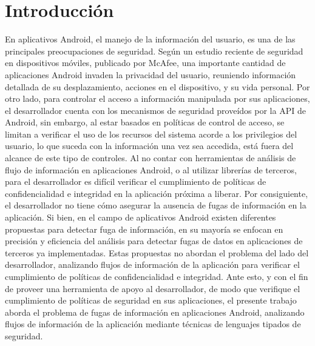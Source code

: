 \label{ch:introduccion}
\chapter{Introducción}
% 
% 

En aplicativos Android, el manejo de la información del usuario, es una de las
principales preocupaciones de seguridad. Según un estudio reciente de seguridad
en dispositivos móviles, publicado por McAfee\cite{McAfeeReport}, una importante
cantidad de aplicaciones Android invaden la privacidad del usuario, reuniendo
información detallada de su desplazamiento, acciones en el dispositivo, y su
vida personal.\newline
Por otro lado, para controlar el acceso a información manipulada por sus
aplicaciones, el desarrollador cuenta con los mecanismos de seguridad proveídos
por la API de Android, sin embargo, al estar basados en políticas de control de
acceso, se limitan a verificar el uso de los recursos del sistema acorde a los
privilegios del usuario, lo que suceda con la información una vez sea accedida,
está fuera del alcance de este tipo de controles. Al no contar con herramientas
de análisis de flujo de información en aplicaciones Android, o al utilizar
librerías de terceros, para el desarrollador es difícil verificar
el cumplimiento de políticas de confidencialidad e integridad en la aplicación
próxima a liberar. Por consiguiente, el desarrollador no tiene cómo asegurar la
ausencia de fugas de información en la aplicación.\newline 
Si bien, en el campo de aplicativos Android existen diferentes propuestas para
detectar fuga de información, en su mayoría  se enfocan en precisión y
eficiencia del análisis para detectar fugas de datos en aplicaciones de terceros
ya implementadas. Estas propuestas
no abordan el problema del lado del desarrollador, analizando flujos de
información de la aplicación para verificar el cumplimiento de políticas de
confidencialidad e integridad.\newline
Ante esto, y con el fin de proveer una herramienta de apoyo al desarrollador, de
modo que verifique el cumplimiento de políticas de seguridad en sus
aplicaciones, el presente trabajo aborda el problema de fugas de información en
aplicaciones Android, analizando flujos de información de la aplicación mediante
técnicas de lenguajes tipados de seguridad.

